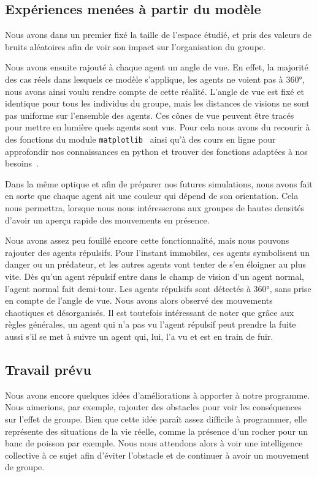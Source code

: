 \documentclass[french, a4paper, 12pt]{article}
\begin{document}
	\subsection{Expériences menées à partir du modèle}
	Nous avons dans un premier fixé la taille de l'espace étudié, et pris des valeurs de bruits aléatoires afin de voir son impact sur l'organisation du groupe.

	Nous avons ensuite rajouté à chaque agent un angle de vue. En effet, la majorité des cas réels dans lesquels ce modèle s'applique, les agents ne voient pas à 360°, nous avons ainsi voulu rendre compte de cette réalité. L'angle de vue est fixé et identique pour tous les individus du groupe, mais les distances de visions ne sont pas uniforme sur l'ensemble des agents. Ces cônes de vue peuvent être tracés pour mettre en lumière quels agents sont vus. Pour cela nous avons du recourir à des fonctions du module \verb|matplotlib|~\cite{matplotlib} ainsi qu'à des cours en ligne pour approfondir nos connaissances en python et trouver des fonctions adaptées à nos besoins~\cite{python}.

	Dans la même optique et afin de préparer nos futures simulations, nous avons fait en sorte que chaque agent ait une couleur qui dépend de son orientation. Cela nous permettra, lorsque nous nous intéresserons aux groupes de hautes densités d'avoir un aperçu rapide des mouvements en présence.
    
	Nous avons assez peu fouillé encore cette fonctionnalité, mais nous pouvons rajouter des agents répulsifs. Pour l'instant immobiles, ces agents symbolisent un danger ou un prédateur, et les autres agents vont tenter de s'en éloigner au plus vite. Dès qu'un agent répulsif entre dans le champ de vision d'un agent normal, l'agent normal fait demi-tour. Les agents répulsifs sont détectés à 360°, sans prise en compte de l'angle de vue. Nous avons alors observé des mouvements chaotiques et désorganisés. Il est toutefois intéressant de noter que grâce aux règles générales, un agent qui n'a pas vu l'agent répulsif peut prendre la fuite aussi s'il se met à suivre un agent qui, lui, l'a vu et est en train de fuir.

	\subsection{Travail prévu}
	Nous avons encore quelques idées d'améliorations à apporter à notre programme. Nous aimerions, par exemple, rajouter des obstacles pour voir les conséquences sur l'effet de groupe. Bien que cette idée paraît assez difficile à programmer, elle représente des situations de la vie réelle, comme la présence d'un rocher pour un banc de poisson par exemple. Nous nous attendons alors à voir une intelligence collective à ce sujet afin d'éviter l'obstacle et de continuer à avoir un mouvement de groupe.
	
\end{document}
